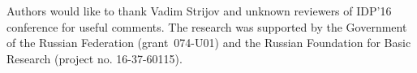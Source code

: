 \documentclass{svproc}
\begin{document}
 

Authors would like to thank Vadim Strijov and unknown reviewers of IDP'16 conference for useful comments. The research was supported by the Government of the Russian Federation (grant~074-U01) and the Russian Foundation for Basic Research (project no. 16-37-60115).



\end{document}
